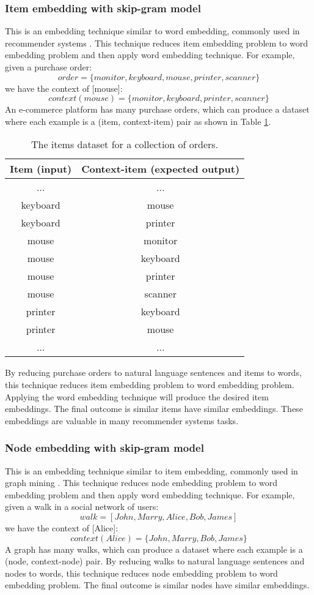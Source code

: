 \documentclass[conference]{IEEEtran}
\begin{document}
\subsubsection{Item embedding with skip-gram model}
This is an embedding technique similar to word embedding, commonly used in recommender systems \cite{barkan2016item2vec}.
This technique reduces item embedding problem to word embedding problem and then apply word embedding technique.
For example, given a purchase order:
\[ order = \{monitor, keyboard, mouse, printer, scanner\} \]
we have the context of [mouse]:
\[ context(mouse) = \{monitor, keyboard, printer, scanner\} \]
An e-commerce platform has many purchase orders, which can produce a dataset where each example is a (item, context-item) pair as shown in Table \ref{tab:items}.
\begin{table}[!ht]
	\centering
	\caption{The items dataset for a collection of orders.}
	\begin{tabular}{cc} \hline
		Item (input) & Context-item (expected output) \\ \hline
		... & ...       \\ \hline
		keyboard & mouse \\ \hline
		keyboard & printer \\ \hline
		mouse & monitor \\ \hline
		mouse & keyboard \\ \hline
		mouse & printer \\ \hline
		mouse & scanner \\ \hline
		printer & keyboard \\ \hline
		printer & mouse \\ \hline
		... & ...       \\ \hline
	\end{tabular}
	\label{tab:items}
\end{table}
By reducing purchase orders to natural language sentences and items to words,
this technique reduces item embedding problem to word embedding problem.
Applying the word embedding technique will produce the desired item embeddings.
The final outcome is similar items have similar embeddings.
These embeddings are valuable in many recommender systems tasks.

\subsubsection{Node embedding with skip-gram model}
This is an embedding technique similar to item embedding, commonly used in
graph mining \cite{perozzi2014deepwalk} \cite{grovernode2vec}.
This technique reduces node embedding problem to word embedding problem and then
apply word embedding technique.
For example, given a walk in a social network of users:
\[ walk = [John, Marry, Alice, Bob, James] \]
we have the context of [Alice]:
\[ context(Alice) = \{John, Marry, Bob, James\} \]
A graph has many walks, which can produce a dataset where each example is a (node, context-node) pair.
By reducing walks to natural language sentences and nodes to words,
this technique reduces node embedding problem to word embedding problem.
The final outcome is similar nodes have similar embeddings.
\end{document}
